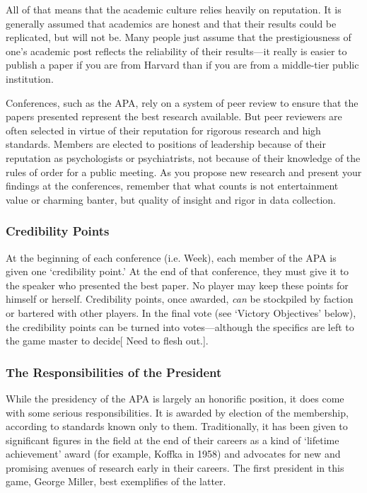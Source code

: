 All of that means that the academic culture relies heavily on reputation. It is generally assumed that academics are honest and that their results could be replicated, but will not be. Many people just assume that the prestigiousness of one’s academic post reflects the reliability of their results---it really is easier to publish a paper if you are from Harvard than if you are from a middle-tier public institution.

Conferences, such as the APA, rely on a system of peer review to ensure that the papers presented represent the best research available. But peer reviewers are often selected in virtue of their reputation for rigorous research and high standards. Members are elected to positions of leadership because of their reputation as psychologists or psychiatrists, not because of their knowledge of the rules of order for a public meeting. As you propose new research and present your findings at the conferences, remember that what counts is not entertainment value or charming banter, but quality of insight and rigor in data collection.

\subsubsection{Credibility Points}
\label{credibilitypoints}

At the beginning of each conference (i.e. Week), each member of the APA is given one ‘credibility point.' At the end of that conference, they must give it to the speaker who presented the best paper. No player may keep these points for himself or herself. Credibility points, once awarded, \emph{can} be stockpiled by faction or bartered with other players. In the final vote (see `Victory Objectives' below), the credibility points can be turned into votes—although the specifics are left to the game master to decide[ Need to flesh out.]. 

\subsubsection{The Responsibilities of the President}
\label{theresponsibilitiesofthepresident}

While the presidency of the APA is largely an honorific position, it does come with some serious responsibilities. It is awarded by election of the membership, according to standards known only to them. Traditionally, it has been given to significant figures in the field at the end of their careers as a kind of `lifetime achievement' award (for example, Koffka in 1958) and advocates for new and promising avenues of research early in their careers. The first president in this game, George Miller, best exemplifies of the latter.

